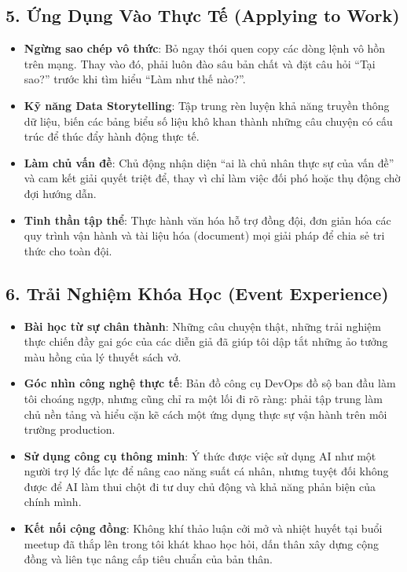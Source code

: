\hypertarget{ux1ee9ng-dux1ee5ng-vuxe0o-thux1ef1c-tux1ebf-applying-to-work}{%
\subsection{5. Ứng Dụng Vào Thực Tế (Applying to
Work)}}

\begin{itemize}
\tightlist
\item
  \textbf{Ngừng sao chép vô thức}: Bỏ ngay thói quen copy các dòng lệnh
  vô hồn trên mạng. Thay vào đó, phải luôn đào sâu bản chất và đặt câu
  hỏi ``Tại sao?'' trước khi tìm hiểu ``Làm như thế nào?''.
\item
  \textbf{Kỹ năng Data Storytelling}: Tập trung rèn luyện khả năng
  truyền thông dữ liệu, biến các bảng biểu số liệu khô khan thành những
  câu chuyện có cấu trúc để thúc đẩy hành động thực tế.
\item
  \textbf{Làm chủ vấn đề}: Chủ động nhận diện ``ai là chủ nhân thực sự
  của vấn đề'' và cam kết giải quyết triệt để, thay vì chỉ làm việc đối
  phó hoặc thụ động chờ đợi hướng dẫn.
\item
  \textbf{Tinh thần tập thể}: Thực hành văn hóa hỗ trợ đồng đội, đơn
  giản hóa các quy trình vận hành và tài liệu hóa (document) mọi giải
  pháp để chia sẻ tri thức cho toàn đội.
\end{itemize}

\hypertarget{trux1ea3i-nghiux1ec7m-khuxf3a-hux1ecdc-event-experience}{%
\subsection{6. Trải Nghiệm Khóa Học (Event
Experience)}}

\begin{itemize}
\tightlist
\item
  \textbf{Bài học từ sự chân thành}: Những câu chuyện thật, những trải
  nghiệm thực chiến đầy gai góc của các diễn giả đã giúp tôi dập tắt
  những ảo tưởng màu hồng của lý thuyết sách vở.
\item
  \textbf{Góc nhìn công nghệ thực tế}: Bản đồ công cụ DevOps đồ sộ ban
  đầu làm tôi choáng ngợp, nhưng cũng chỉ ra một lối đi rõ ràng: phải
  tập trung làm chủ nền tảng và hiểu cặn kẽ cách một ứng dụng thực sự
  vận hành trên môi trường production.
\item
  \textbf{Sử dụng công cụ thông minh}: Ý thức được việc sử dụng AI như
  một người trợ lý đắc lực để nâng cao năng suất cá nhân, nhưng tuyệt
  đối không được để AI làm thui chột đi tư duy chủ động và khả năng phản
  biện của chính mình.
\item
  \textbf{Kết nối cộng đồng}: Không khí thảo luận cởi mở và nhiệt huyết
  tại buổi meetup đã thắp lên trong tôi khát khao học hỏi, dấn thân xây
  dựng cộng đồng và liên tục nâng cấp tiêu chuẩn của bản thân.
\end{itemize}


